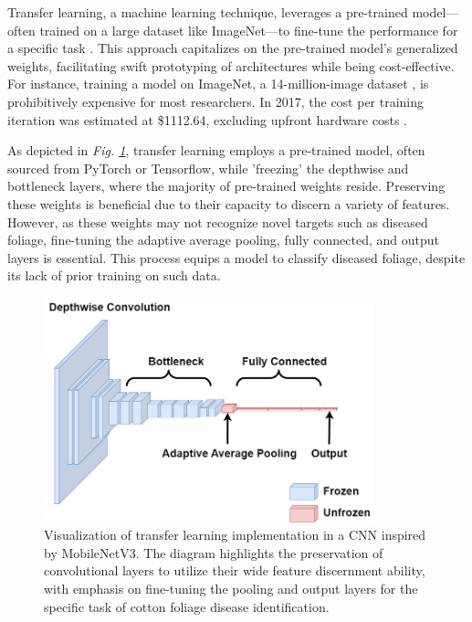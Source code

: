 \documentclass[conference]{IEEEtran}
\begin{document}
Transfer learning, a machine learning technique, leverages a pre-trained model—often trained on a large dataset like ImageNet—to fine-tune the performance for a specific task \cite{Shu}. This approach capitalizes on the pre-trained model's generalized weights, facilitating swift prototyping of architectures while being cost-effective. For instance, training a model on ImageNet, a 14-million-image dataset \cite{Reynolds}, is prohibitively expensive for most researchers. In 2017, the cost per training iteration was estimated at \$1112.64, excluding upfront hardware costs \cite{genuineimpact}.

As depicted in \emph{Fig. \ref{Transfer Learning}}, transfer learning employs a pre-trained model, often sourced from PyTorch or Tensorflow, while 'freezing' the depthwise and bottleneck layers, where the majority of pre-trained weights reside. Preserving these weights is beneficial due to their capacity to discern a variety of features. However, as these weights may not recognize novel targets such as diseased foliage, fine-tuning the adaptive average pooling, fully connected, and output layers is essential. This process equips a model to classify diseased foliage, despite its lack of prior training on such data.

\begin{figure}[h]
\centerline{\includegraphics[height=6.5cm, width=1\linewidth]{Images/MobileNet_Small.png}}
\caption{Visualization of transfer learning implementation in a CNN inspired by MobileNetV3. The diagram highlights the preservation of convolutional layers to utilize their wide feature discernment ability, with emphasis on fine-tuning the pooling and output layers for the specific task of cotton foliage disease identification.}
\label{Transfer Learning}
\end{figure}
\end{document}
